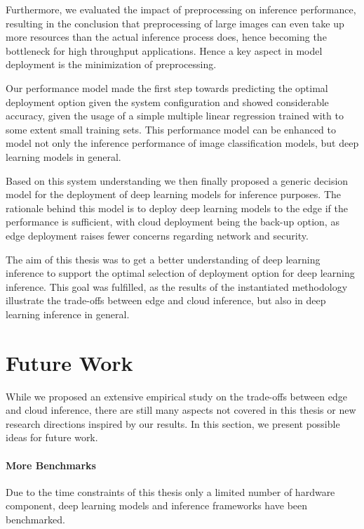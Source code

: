 Furthermore, we evaluated the impact of preprocessing on inference performance, resulting in the conclusion that preprocessing of large images can even take up more resources than the actual inference process does, hence becoming the bottleneck for high throughput applications.
Hence a key aspect in model deployment is the minimization of preprocessing.

Our performance model made the first step towards predicting the optimal deployment option given the system configuration and showed considerable accuracy, given the usage of a simple multiple linear regression trained with to some extent small training sets.
This performance model can be enhanced to model not only the inference performance of image classification models, but deep learning models in general.

Based on this system understanding we then finally proposed a generic decision model for the deployment of deep learning models for inference purposes. The rationale behind this model is to deploy deep learning models to the edge if the performance is sufficient, with cloud deployment being the back-up option, as edge deployment raises fewer concerns regarding network and security.


The aim of this thesis was to get a better understanding of deep learning inference to support the optimal selection of deployment option for deep learning inference.
This goal was fulfilled, as the results of the instantiated methodology illustrate the trade-offs between edge and cloud inference, but also in deep learning inference in general.




\section{Future Work}
While we proposed an extensive empirical study on the trade-offs between edge and cloud inference, there are still many aspects not covered in this thesis or new research directions inspired by our results. 
In this section, we present possible ideas for future work.

\paragraph{More Benchmarks}
Due to the time constraints of this thesis only a limited number of hardware component, deep learning models and inference frameworks have been benchmarked.

